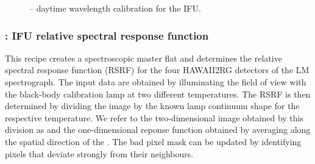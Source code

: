 \begin{figure}[hb]
    \centering
    \def \globalscale {0.700000}
    \fontsize{10}{12}\selectfont
    
  \caption[Recipe: ]{ --
    daytime wavelength calibration for the IFU.}
  \label{fig:metis_ifu_wavecal}
\end{figure}


\clearpage
\subsubsection{: IFU relative spectral response function}
\label{sssec:ifu_rsrf}
\label{rec:metis_ifu_rsrf}

This recipe creates a spectroscopic master flat and determines the
relative spectral response function (RSRF) for the four HAWAII2RG
detectors of the LM spectrograph. The input data are obtained by
illuminating the field of view with the black-body calibration lamp at
two different temperatures. The RSRF is then determined by dividing
the image by the known lamp continuum shape for the respective
temperature. We refer to the two-dimensional image obtained by this
division as  and the one-dimensional reponse
function obtained by averaging along the spatial direction of the
. The bad pixel mask can be updated by identifying pixels
that deviate strongly from their neighbours.

